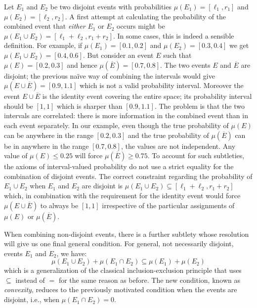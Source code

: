 \documentclass[english,reprint, aps, prl,superscriptaddress, showpacs,
showkeys, longbibliography, amsmath, amssymb]{revtex4-1}
\theoremstyle{plain}
\theoremstyle{definition}
\newcommand{\nb}{\nolinebreak[1] }
\begin{document}
Let $E_1$ and $E_2$ be two disjoint events with probabilities
$\mu(E_1)=[\ell_1,r_1]$ and $\mu(E_2)=[\ell_2,r_2]$. A first attempt
at calculating the probability of the combined event that \emph{either} $E_1$
or $E_2$ occurs might be $\mu(E_1\cup E_2) = [\ell_1+\ell_2,r_1+r_2]$. In
some cases, this is indeed a sensible definition. For example, if
$\mu(E_1)=[0.1,0.2]$ and $\mu(E_2)=[0.3,0.4]$ we get
$\mu(E_1\cup E_2) = [0.4,0.6]$. But consider an event $E$ such that
$\mu(E)=[0.2,0.3]$ and hence $\mu(\overline{E})=[0.7,0.8]$. The two
events $E$ and $\overline{E}$ are disjoint; the previous naïve way
of combining the intervals would give $\mu(E\cup\overline{E})=[0.9,1.1]$
which is not a valid probability interval. Moreover the event
$E\cup\overline{E}$ is the identity event covering the entire space; its
probability interval should be $[1,1]$ which is sharper than
$[0.9,1.1]$. The problem is that the two intervals are correlated:
there is more information in the combined event than in each event
separately. In our example, even though the true probability of
$\mu(E)$ can be anywhere in the range $[0.2,0.3]$ and the true
probability of $\mu(\overline{E})$ can be in anywhere in the range
$[0.7,0.8]$, the values are not independent. Any value of
$\mu(E) \leq 0.25$ will force $\mu(\overline{E})\geq 0.75$. To account
for such subtleties, the axioms of interval-valued probability do not
use a strict equality for the combination of disjoint events. The
correct constraint regarding the probability of $E_1\cup E_2$ when $E_1$
and $E_2$ are disjoint is
$\mu(E_1\cup E_2) \subseteq [\ell_1+\ell_2,r_1+r_2]$ which, in combination
with the requirement for the identity event would force
$\mu(E\cup\overline{E})$ to always be $[1,1]$ irrespective of the
particular assignments of $\mu(E)$ or $\mu(\overline{E})$. 

When combining non-disjoint events, there is a further subtlety whose
resolution will give us one final general condition. For
general, not necessarily disjoint, events $E_1$ and $E_2$, we have:
\begin{equation}
\mu(E_1\cup E_2) + \mu(E_1\cap E_2) \subseteq \mu(E_1) + \mu(E_2)
\label{eq:classicalconvex}
\end{equation}
which is a generalization of the classical inclusion-exclusion
principle that uses $\subseteq$ instead of $=$ for the same reason as
before. The new condition, known as
\emph{convexity}\nb\cite{Shapley1971,GilboaSchmeidler1994,Marinacci1999,Grabisch2016},
reduces to the previously
motivated condition when the events are disjoint, i.e., when
$\mu(E_1\cap E_2) = 0$.
\end{document}
